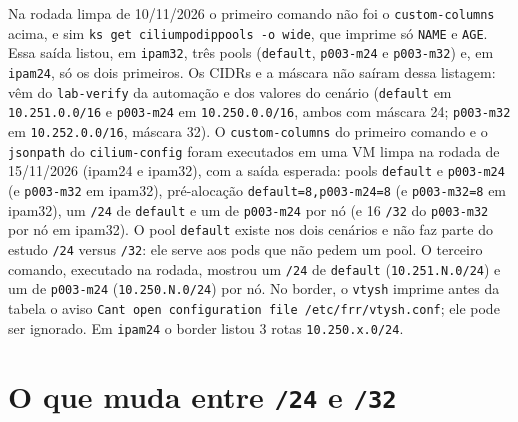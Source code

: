 \documentclass[12pt,openany,oneside,a4paper,chapter=TITLE,english,brazil]{abntex2}
\begin{document}
Na rodada limpa de 10/11/2026 o primeiro comando não foi o \texttt{custom-{}\allowbreak{}columns}
acima, e sim \texttt{ks get ciliumpodippools -{}\allowbreak{}o wide}, que imprime só \texttt{NAME} e \texttt{AGE}.
Essa saída listou, em \texttt{ipam32}, três pools (\texttt{default}, \texttt{p003-{}\allowbreak{}m24} e \texttt{p003-{}\allowbreak{}m32})
e, em \texttt{ipam24}, só os dois primeiros. Os CIDRs e a máscara não saíram dessa
listagem: vêm do \texttt{lab-{}\allowbreak{}verify} da automação e dos valores do cenário
(\texttt{default} em \texttt{10.\allowbreak{}251.\allowbreak{}0.\allowbreak{}0/\allowbreak{}16} e \texttt{p003-{}\allowbreak{}m24} em \texttt{10.\allowbreak{}250.\allowbreak{}0.\allowbreak{}0/\allowbreak{}16}, ambos com
máscara 24; \texttt{p003-{}\allowbreak{}m32} em \texttt{10.\allowbreak{}252.\allowbreak{}0.\allowbreak{}0/\allowbreak{}16}, máscara 32). O \texttt{custom-{}\allowbreak{}columns} do
primeiro comando e o \texttt{jsonpath} do \texttt{cilium-{}\allowbreak{}config} foram executados em uma
VM limpa na rodada de 15/11/2026 (ipam24 e ipam32), com a saída esperada:
pools \texttt{default} e \texttt{p003-{}\allowbreak{}m24} (e \texttt{p003-{}\allowbreak{}m32} em ipam32), pré-alocação
\texttt{default=\allowbreak{}8,\allowbreak{}p003-{}\allowbreak{}m24=\allowbreak{}8} (e \texttt{p003-{}\allowbreak{}m32=\allowbreak{}8} em ipam32), um \texttt{/\allowbreak{}24} de \texttt{default} e um
de \texttt{p003-{}\allowbreak{}m24} por nó (e 16 \texttt{/\allowbreak{}32} do \texttt{p003-{}\allowbreak{}m32} por nó em ipam32). O pool \texttt{default} existe nos dois cenários e não faz parte do estudo
\texttt{/\allowbreak{}24} versus \texttt{/\allowbreak{}32}: ele serve aos pods que não pedem um pool. O terceiro
comando, executado na rodada, mostrou um \texttt{/\allowbreak{}24} de \texttt{default} (\texttt{10.\allowbreak{}251.\allowbreak{}N.\allowbreak{}0/\allowbreak{}24})
e um de \texttt{p003-{}\allowbreak{}m24} (\texttt{10.\allowbreak{}250.\allowbreak{}N.\allowbreak{}0/\allowbreak{}24}) por nó. No border, o \texttt{vtysh} imprime antes
da tabela o aviso \texttt{Can\textquotesingle{}t open configuration file /\allowbreak{}etc/\allowbreak{}frr/\allowbreak{}vtysh.\allowbreak{}conf}; ele pode
ser ignorado. Em \texttt{ipam24} o border listou 3 rotas \texttt{10.\allowbreak{}250.\allowbreak{}x.\allowbreak{}0/\allowbreak{}24}.

\section{\texorpdfstring{O que muda entre \texttt{/\allowbreak{}24} e \texttt{/\allowbreak{}32}}{O que muda entre  e }}\label{o-que-muda-entre-24-e-32}
\end{document}
